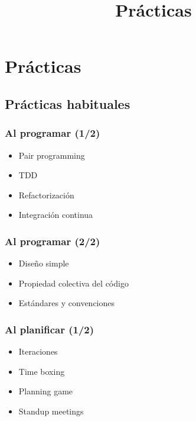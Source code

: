 
\title[Prácticas ágiles]{Prácticas}
\date{}
\author[Pepe Doval]{}
\institute{}

\section{Prácticas}
\label{sec:Practicas}


\begin{frame}
  \titlepage
  \begin{figure}[ht]
    \centering
    \vspace*{-2.5cm}
  \end{figure}
\end{frame}

\subsection{Prácticas habituales}
\label{subsec:Practicas}

\begin{frame}
  \frametitle{Al programar (1/2)}
  \begin{itemize}
    \item Pair programming
    \item TDD
    \item Refactorización
    \item Integración continua
  \end{itemize}
\end{frame}

\begin{frame}
  \frametitle{Al programar (2/2)}
  \begin{itemize}
    \item Diseño simple
    \item Propiedad colectiva del código
    \item Estándares y convenciones
  \end{itemize}
\end{frame}

\begin{frame}
  \frametitle{Al planificar (1/2)}
  \begin{itemize}
    \item Iteraciones
    \item Time boxing
    \item Planning game
    \item Standup meetings
  \end{itemize}
\end{frame}


